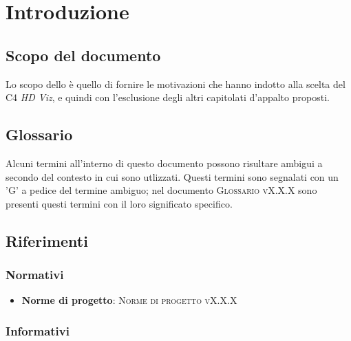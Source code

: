 \documentclass{article}
\begin{document}


\section{Introduzione}%
\label{sec:introduzione}

\subsection{Scopo del documento}%
\label{sub:scopo_del_documento}
Lo scopo dello \textsc{\placeholderTitle} è quello di fornire le motivazioni che hanno indotto alla scelta del  C4 \emph{HD Viz}, e quindi con l'esclusione degli altri capitolati d'appalto proposti.

\subsection{Glossario}%
\label{sub:glossario}
Alcuni termini all'interno di questo documento possono risultare ambigui a secondo del contesto in cui sono utlizzati.
Questi termini sono segnalati con un 'G' a pedice del termine ambiguo; nel documento \textsc{Glossario vX.X.X} sono presenti questi termini con il loro significato specifico.


\subsection{Riferimenti}%
\label{sub:riferimenti}

\subsubsection{Normativi}%
\label{subs:normativi}

\begin{itemize}
  \item \textbf{Norme di progetto}: \textsc{Norme di progetto vX.X.X}
\end{itemize}

\subsubsection{Informativi}%
\label{subs:informativi}
\end{document}
